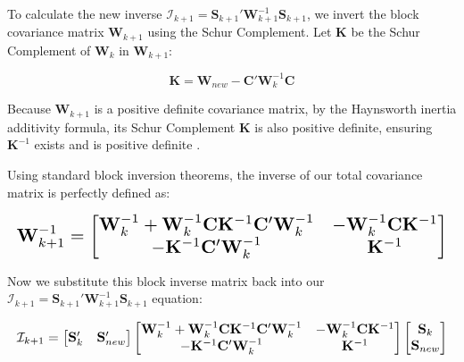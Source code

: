 \documentclass[sn-basic,Numbered,iicol]{sn-jnl}
\theoremstyle{thmstyleone}%
\theoremstyle{thmstyletwo}%
\theoremstyle{thmstylethree}%
\begin{document}
To calculate the new inverse $\mathcal{I}_{k+1}=\mathbf{S}_{k+1}'\mathbf{W}_{k+1}^{-1}\mathbf{S}_{k+1}$, we invert the block covariance matrix $\mathbf{W}_{k+1}$ using the Schur Complement. Let $\mathbf{K}$ be the Schur Complement of $\mathbf{W}_k$ in $\mathbf{W}_{k+1}$:

\begin{equation}
\mathbf{K}=\mathbf{W}_{new}-\mathbf{C}'\mathbf{W}_k^{-1}\mathbf{C}
\end{equation}

Because $\mathbf{W}_{k+1}$ is a positive definite covariance matrix, by the Haynsworth inertia additivity formula, its Schur Complement $\mathbf{K}$ is also positive definite, ensuring $\mathbf{K}^{-1}$ exists and is positive definite \cite{zhangschur}.

Using standard block inversion theorems, the inverse of our total covariance matrix is perfectly defined as:

\begin{equation}
\resizebox{\columnwidth}{!}{$\displaystyle
\mathbf{W}_{k+1}^{-1} = \begin{bmatrix} \mathbf{W}_k^{-1} + \mathbf{W}_k^{-1}\mathbf{C}\mathbf{K}^{-1}\mathbf{C}'\mathbf{W}_k^{-1} & -\mathbf{W}_k^{-1}\mathbf{C}\mathbf{K}^{-1} \\ -\mathbf{K}^{-1}\mathbf{C}'\mathbf{W}_k^{-1} & \mathbf{K}^{-1} \end{bmatrix}
$}
\end{equation}

Now we substitute this block inverse matrix back into our $\mathcal{I}_{k+1}=\mathbf{S}_{k+1}'\mathbf{W}_{k+1}^{-1}\mathbf{S}_{k+1}$ equation:

\begin{equation}
\resizebox{\columnwidth}{!}{$\displaystyle
\mathcal{I}_{k+1} = \begin{bmatrix} \mathbf{S}_k' & \mathbf{S}_{new}' \end{bmatrix} \begin{bmatrix} \mathbf{W}_k^{-1} + \mathbf{W}_k^{-1}\mathbf{C}\mathbf{K}^{-1}\mathbf{C}'\mathbf{W}_k^{-1} & -\mathbf{W}_k^{-1}\mathbf{C}\mathbf{K}^{-1} \\ -\mathbf{K}^{-1}\mathbf{C}'\mathbf{W}_k^{-1} & \mathbf{K}^{-1} \end{bmatrix} \begin{bmatrix} \mathbf{S}_k \\ \mathbf{S}_{new} \end{bmatrix}
$}
\end{equation}
\end{document}
